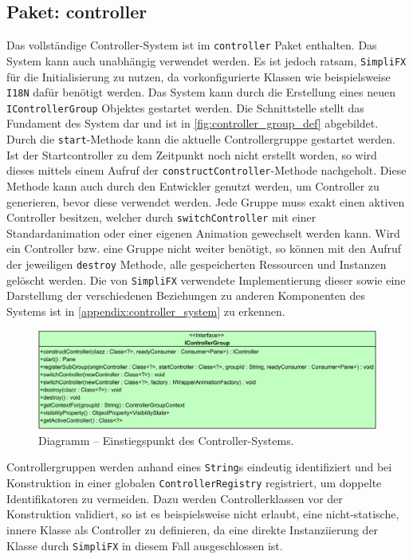 \subsection{Paket: controller}
Das vollständige Controller-System ist im \texttt{controller} Paket enthalten. Das System kann auch unabhängig verwendet werden. Es ist jedoch ratsam, \texttt{SimpliFX} für die Initialisierung zu nutzen, da vorkonfigurierte Klassen wie beispielsweise \texttt{I18N} dafür benötigt werden. Das System kann durch die Erstellung eines neuen \texttt{IControllerGroup} Objektes gestartet werden. Die Schnittstelle stellt das Fundament des System dar und ist in \autoref{fig:controller_group_def} abgebildet. Durch die \texttt{start}-Methode kann die aktuelle Controllergruppe gestartet werden. Ist der Startcontroller zu dem Zeitpunkt noch nicht erstellt worden, so wird dieses mittels einem Aufruf der \texttt{constructController}-Methode nachgeholt. Diese Methode kann auch durch den Entwickler genutzt werden, um Controller zu generieren, bevor diese verwendet werden. Jede Gruppe muss exakt einen aktiven Controller besitzen, welcher durch \texttt{switchController} mit einer Standardanimation oder einer eigenen Animation gewechselt werden kann. Wird ein Controller bzw. eine Gruppe nicht weiter benötigt, so können mit den Aufruf der jeweiligen \texttt{destroy} Methode, alle gespeicherten Ressourcen und Instanzen gelöscht werden. Die von \texttt{SimpliFX} verwendete Implementierung dieser sowie eine Darstellung der verschiedenen Beziehungen zu anderen Komponenten des Systems ist in \autoref{appendix:controller_system} zu erkennen.
\begin{figure}[H]
	\centering
	\includegraphics[width=\textwidth]{Abbildungen/Controller-System-Group.png}
	\caption{Diagramm -- Einstiegspunkt des Controller-Systems.}
	\label{fig:controller_group_def}
\end{figure}
Controllergruppen werden anhand eines \texttt{String}s eindeutig identifiziert und bei Konstruktion in einer globalen \texttt{ControllerRegistry} registriert, um doppelte Identifikatoren zu vermeiden. Dazu werden Controllerklassen vor der Konstruktion validiert, so ist es beispielsweise nicht erlaubt, eine nicht-statische, innere Klasse als Controller zu definieren, da eine direkte Instanziierung der Klasse durch \texttt{SimpliFX} in diesem Fall ausgeschlossen ist.
